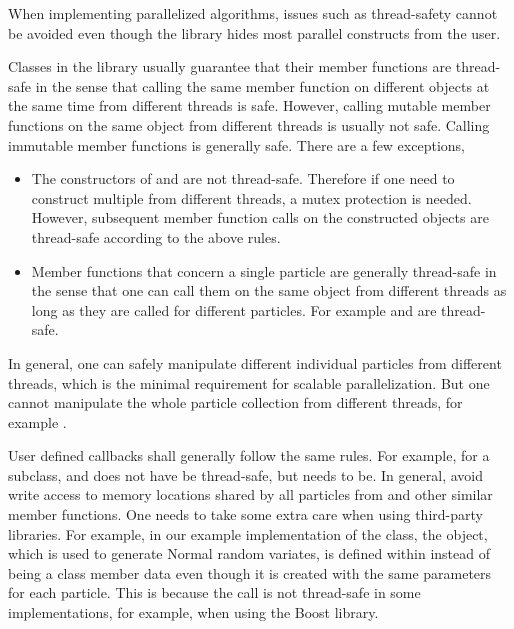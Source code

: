 When implementing parallelized \smc algorithms, issues such as thread-safety
cannot be avoided even though the \vsmc library hides most parallel constructs
from the user.

Classes in the \vsmc library usually guarantee that their member functions are
thread-safe in the sense that calling the same member function on different
objects at the same time from different threads is safe. However, calling
mutable member functions on the same object from different threads is usually
not safe. Calling immutable member functions is generally safe. There are a
few exceptions,
\begin{itemize}
  \item The constructors of  and  are
    not thread-safe. Therefore if one need to construct multiple
     from different threads, a mutex protection is needed.
    However, subsequent member function calls on the constructed objects are
    thread-safe according to the above rules.
  \item Member functions that concern a single particle are generally
    thread-safe in the sense that one can call them on the same object from
    different threads as long as they are called for different particles. For
    example  and  are
    thread-safe.
\end{itemize}
In general, one can safely manipulate different individual particles from
different threads, which is the minimal requirement for scalable
parallelization. But one cannot manipulate the whole particle collection from
different threads, for example .

User defined callbacks shall generally follow the same rules. For example, for
a  subclass,  and
 does not have be thread-safe, but
 needs to be. In general, avoid write access to memory
locations shared by all particles from  and other
similar member functions. One needs to take some extra care when using
third-party libraries. For example, in our example implementation of the
 class, the  object, which is used to
generate Normal random variates, is defined within 
instead of being a class member data even though it is created with the same
parameters for each particle. This is because the call
 is not thread-safe in some implementations, for
example, when using the Boost library.

